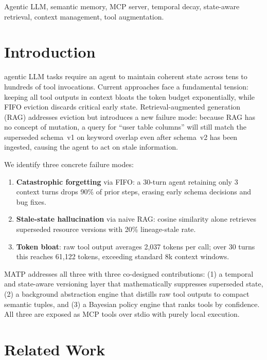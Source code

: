 \documentclass[lettersize,journal]{IEEEtran}
\begin{document}
\begin{IEEEkeywords}
Agentic LLM, semantic memory, MCP server, temporal decay, state-aware retrieval, context management, tool augmentation.
\end{IEEEkeywords}

\section{Introduction}
 agentic LLM tasks require an agent to maintain coherent state across tens to hundreds of tool invocations. Current approaches face a fundamental tension: keeping all tool outputs in context bloats the token budget exponentially, while FIFO eviction discards critical early state. Retrieval-augmented generation (RAG) addresses eviction but introduces a new failure mode: because RAG has no concept of mutation, a query for ``user table columns'' will still match the superseded schema~v1 on keyword overlap even after schema~v2 has been ingested, causing the agent to act on stale information.

We identify three concrete failure modes:

\begin{enumerate}
    \item \textbf{Catastrophic forgetting} via FIFO: a 30-turn agent retaining only 3 context turns drops 90\% of prior steps, erasing early schema decisions and bug fixes.
    \item \textbf{Stale-state hallucination} via naive RAG: cosine similarity alone retrieves superseded resource versions with 20\% lineage-stale rate.
    \item \textbf{Token bloat}: raw tool output averages 2,037 tokens per call; over 30 turns this reaches 61,122 tokens, exceeding standard 8k context windows.
\end{enumerate}

MATP addresses all three with three co-designed contributions: (1) a temporal and state-aware versioning layer that mathematically suppresses superseded state, (2) a background abstraction engine that distills raw tool outputs to compact semantic tuples, and (3) a Bayesian policy engine that ranks tools by confidence. All three are exposed as MCP tools over stdio with purely local execution.

\section{Related Work}
\end{document}
